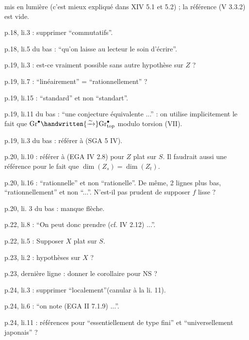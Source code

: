  mis en lumière (c'est mieux expliqué dans XIV 5.1 et 5.2) ; la référence (V 3.3.2) est vide.

p.18, li.3 : supprimer ``commutatifs''.

p.18, li.5 du bas : ``qu'on laisse au lecteur le soin d'écrire''.

p.19, li.3 : est-ce vraiment possible sans autre hypothèse sur $Z$ ?

p.19, li.7 : ``linéairement'' = ``rationnellement'' ?

p.19, li.15 : ``standard'' et non ``standart''.

p.19, li.11 du bas : ``une conjecture équivalente ...'' : on utilise implicitement le fait que $\mathrm{Gr}^{\bullet}\handwritten{\xrightarrow{\sim}}\mathrm{Gr}^{\bullet}_{\mathrm{top}}$ modulo torsion (VII\hspace{2em}).

p.19, li.3 du bas : référer à (SGA 5 IV\hspace{2em}).

p.20, li.10 : référer à (EGA IV 2.8) pour $Z$ plat sur $S$. Il faudrait aussi une référence pour le fait que $\dim(Z_s) = \dim(Z_t)$.

p.20, li.16 : ``rationnelle'' et non ``rationelle''. De même, 2 lignes plus bas, ``rationnellement'' et non ``...''. N'est-il pas prudent de supposer $f$ lisse ?

p.20, li. 3 du bas : manque flèche.

p.22, li.8 : ``On peut donc prendre (cf. IV 2.12) ...''.

p.22, li.5 : Supposer $X$ plat sur $S$.

p.23, li.2 : hypothèses sur $X$ ?

p.23, dernière ligne : donner le corollaire pour $\mathrm{NS}$ ?

p.24, li.3 : supprimer ``localement''(canular à la li. 11).

p.24, li.6 : ``on note (EGA II 7.1.9) ...''.

p.24, li.11 : références pour ``essentiellement de type fini'' et  ``universellement japonais'' ?

